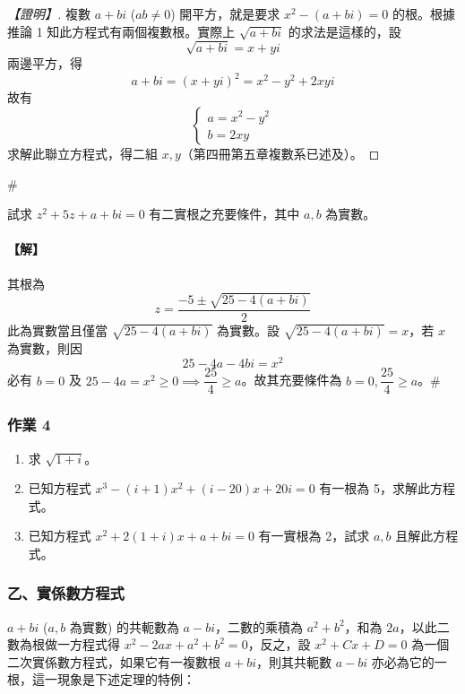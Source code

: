 \begin{proof}[【證明】]
複數 $a+bi$ ($ab \ne 0$) 開平方，就是要求 $x^2-(a+bi)=0$ 的根。根據推論 1 知此方程式有兩個複數根。實際上 $\sqrt{a+bi}$ 的求法是這樣的，設
\[ \sqrt{a+bi} = x+yi \]
兩邊平方，得
\[ a+bi = (x+yi)^2 = x^2-y^2 + 2xyi \]
故有
\[ \begin{cases} a = x^2-y^2 \\ b = 2xy \end{cases} \]
求解此聯立方程式，得二組 $x, y$（第四冊第五章複數系已述及）。
\end{proof}\hfill$\#$

\begin{example}\label{ex:b6s-2-4}
試求 $z^2+5z+a+bi=0$ 有二實根之充要條件，其中 $a, b$ 為實數。
\end{example}

\paragraph{【解】}
其根為
\[ z = \dfrac{-5 \pm \sqrt{25 - 4(a+bi)}}{2} \]
此為實數當且僅當 $\sqrt{25 - 4(a+bi)}$ 為實數。設 $\sqrt{25 - 4(a+bi)} = x$，若 $x$ 為實數，則因
\[ 25 - 4a - 4bi = x^2 \]
必有 $b=0$ 及 $25-4a = x^2 \ge 0 \implies \dfrac{25}{4} \ge a$。故其充要條件為 $b=0, \dfrac{25}{4} \ge a$。\hfill$\#$

\subsubsection*{作業 4}\label{hw:b6s-2-4}
\begin{enumerate}[label=(\roman*), leftmargin=2em]
  \item 求 $\sqrt{1+i}$。
  \item 已知方程式 $x^3 - (i+1)x^2 + (i-20)x + 20i = 0$ 有一根為 5，求解此方程式。
  \item 已知方程式 $x^2 + 2(1+i)x + a + bi = 0$ 有一實根為 2，試求 $a, b$ 且解此方程式。
\end{enumerate}

\subsubsection*{乙、實係數方程式}\label{subsec:b6s-2-2-b}

$a+bi$ ($a, b$ 為實數) 的共軛數為 $a-bi$，二數的乘積為 $a^2+b^2$，和為 $2a$，以此二數為根做一方程式得 $x^2 - 2ax + a^2 + b^2 = 0$，反之，設 $x^2 + Cx + D = 0$ 為一個二次實係數方程式，如果它有一複數根 $a+bi$，則其共軛數 $a-bi$ 亦必為它的一根，這一現象是下述定理的特例：

